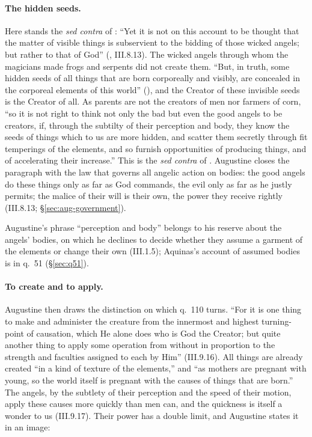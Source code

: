 \paragraph{The hidden seeds.} Here stands the \emph{sed contra} of
: ``Yet it is not on this account to be thought that the
matter of visible things is subservient to the bidding of those wicked
angels; but rather to that of God'' (, III.8.13). The wicked angels through whom the magicians
made frogs and serpents did not create them. ``But, in truth, some hidden
seeds of all things that are born corporeally and visibly, are concealed in
the corporeal elements of this world'' (), and
the Creator of these invisible seeds is the Creator of all. As parents are
not the creators of men nor farmers of corn, ``so it is not right to think
not only the bad but even the good angels to be creators, if, through the
subtilty of their perception and body, they know the seeds of things which
to us are more hidden, and scatter them secretly through fit temperings of
the elements, and so furnish opportunities of producing things, and of
accelerating their increase.'' This is the \emph{sed contra} of . Augustine closes the paragraph with the law that governs all
angelic action on bodies: the good angels do these things only as far as
God commands, the evil only as far as he justly permits; the malice of
their will is their own, the power they receive rightly (III.8.13;
\S\ref{sec:aug-government}).

Augustine's phrase ``perception and body'' belongs to his reserve about the
angels' bodies, on which he declines to decide whether they assume a
garment of the elements or change their own (III.1.5); Aquinas's account of
assumed bodies is in q.~51 (\S\ref{sec:q51}).

\paragraph{To create and to apply.} Augustine then draws the distinction on
which q.~110 turns. ``For it is one thing to make and administer the
creature from the innermost and highest turning-point of causation, which
He alone does who is God the Creator; but quite another thing to apply some
operation from without in proportion to the strength and faculties
assigned to each by Him'' (III.9.16). All things are already created ``in a
kind of texture of the elements,'' and ``as mothers are pregnant with
young, so the world itself is pregnant with the causes of things that are
born.'' The angels, by the subtlety of their perception and the speed of
their motion, apply these causes more quickly than men can, and the
quickness is itself a wonder to us (III.9.17). Their power has a double
limit, and Augustine states it in an image:

